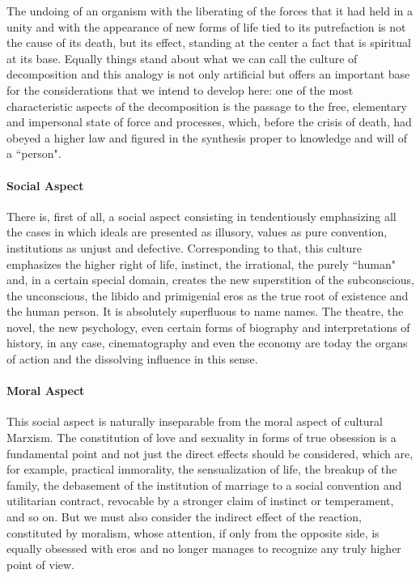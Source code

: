 The undoing of an organism with the liberating of the forces that it had held in a unity and with the appearance of new forms of life tied to its putrefaction is not the cause of its death, but its effect, standing at the center a fact that is spiritual at its base. Equally things stand about what we can call the culture of decomposition and this analogy is not only artificial but offers an important base for the considerations that we intend to develop here: one of the most characteristic aspects of the decomposition is the passage to the free, elementary and impersonal state of force and processes, which, before the crisis of death, had obeyed a higher law and figured in the synthesis proper to knowledge and will of a ``person".

\paragraph{Social Aspect}
There is, first of all, a social aspect consisting in tendentiously emphasizing all the cases in which ideals are presented as illusory, values as pure convention, institutions as unjust and defective. Corresponding to that, this culture emphasizes the higher right of life, instinct, the irrational, the purely ``human" and, in a certain special domain, creates the new superstition of the subconscious, the unconscious, the libido and primigenial eros as the true root of existence and the human person. It is absolutely superfluous to name names. The theatre, the novel, the new psychology, even certain forms of biography and interpretations of history, in any case, cinematography and even the economy are today the organs of action and the dissolving influence in this sense.

\paragraph{Moral Aspect}
This social aspect is naturally inseparable from the moral aspect of cultural Marxism. The constitution of love and sexuality in forms of true obsession is a fundamental point and not just the direct effects should be considered, which are, for example, practical immorality, the sensualization of life, the breakup of the family, the debasement of the institution of marriage to a social convention and utilitarian contract, revocable by a stronger claim of instinct or temperament, and so on. But we must also consider the indirect effect of the reaction, constituted by moralism, whose attention, if only from the opposite side, is equally obsessed with eros and no longer manages to recognize any truly higher point of view.

